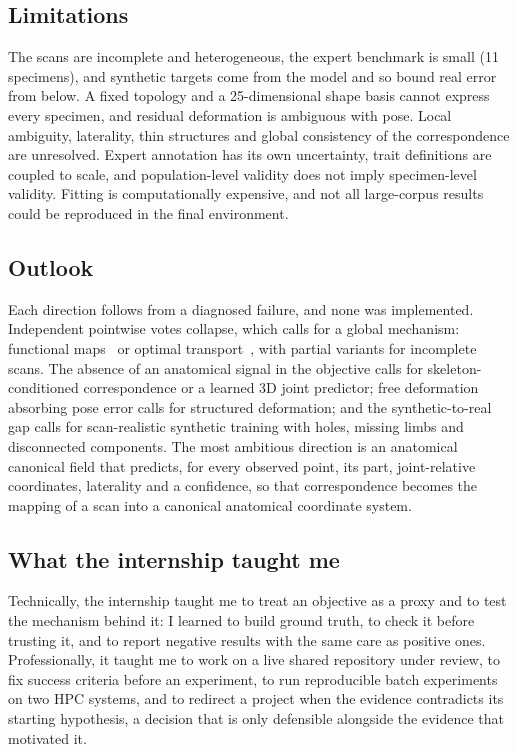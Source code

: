 \subsection{Limitations}

The scans are incomplete and heterogeneous, the expert benchmark is small (11
specimens), and synthetic targets come from the model and so bound real error
from below. A fixed topology and a 25-dimensional shape basis cannot express
every specimen, and residual deformation is ambiguous with pose. Local
ambiguity, laterality, thin structures and global consistency of the
correspondence are unresolved. Expert annotation has its own uncertainty,
trait definitions are coupled to scale, and population-level validity does not
imply specimen-level validity. Fitting is computationally expensive, and not
all large-corpus results could be reproduced in the final environment.

\subsection{Outlook}

Each direction follows from a diagnosed failure, and none was implemented.
Independent pointwise votes collapse, which calls for a global mechanism:
functional maps~\cite{fmaps} or optimal transport~\cite{ot}, with partial
variants for incomplete scans. The absence of an anatomical signal in the
objective calls for skeleton-conditioned correspondence or a learned 3D joint
predictor; free deformation absorbing pose error calls for structured
deformation; and the synthetic-to-real gap calls for scan-realistic synthetic
training with holes, missing limbs and disconnected components. The most
ambitious direction is an anatomical canonical field that predicts, for every
observed point, its part, joint-relative coordinates, laterality and a
confidence, so that correspondence becomes the mapping of a scan into a
canonical anatomical coordinate system.

\subsection{What the internship taught me}

Technically, the internship taught me to treat an objective as a proxy and to
test the mechanism behind it: I learned to build ground truth, to check it
before trusting it, and to report negative results with the same care as
positive ones. Professionally, it taught me to work on a live shared
repository under review, to fix success criteria before an experiment, to run
reproducible batch experiments on two HPC systems, and to redirect a project
when the evidence contradicts its starting hypothesis, a decision that is only
defensible alongside the evidence that motivated it.
